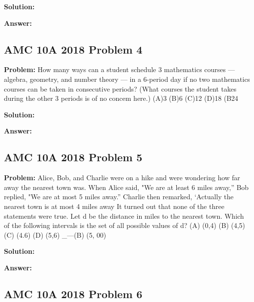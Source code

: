 \documentclass{article}
\newenvironment{problem}{\textbf{Problem: }}{\\}
\newenvironment{solution}{\textbf{Solution: }}{\\}
\newenvironment{answer}{\textbf{Answer: }}{\\}
\begin{document}
\begin{solution}
\end{solution}

\begin{answer}
\end{answer}

\subsection{AMC 10A 2018 Problem 4}

\begin{problem}
How many ways can a student schedule 3 mathematics courses — algebra, geometry, and number theory — in a 6-period day if no two mathematics courses can be taken in consecutive periods? (What courses the student takes during the other 3 periods is of no concem here.) (A)3 (B)6 (C)12 (D)18 (B24
\end{problem}

\begin{solution}
\end{solution}

\begin{answer}
\end{answer}

\subsection{AMC 10A 2018 Problem 5}

\begin{problem}
Alice, Bob, and Charlie were on a hike and were wondering how far away the nearest town was. When Alice said, "We are at least 6 miles away,” Bob replied, "We are at most 5 miles away.” Charlie then remarked, ‘Actually the nearest town is at most 4 miles away It turned out that none of the three statements were true. Let d be the distance in miles to the nearest town. Which of the following intervals is the set of all possible values of d? (A) (0,4) (B) (4,5) (C) (4.6) (D) (5,6) _—(B) (5, 00)
\end{problem}

\begin{solution}
\end{solution}

\begin{answer}
\end{answer}

\subsection{AMC 10A 2018 Problem 6}
\end{document}
